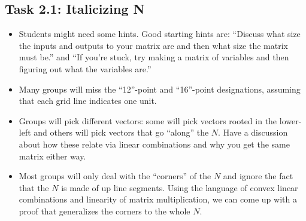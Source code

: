 \documentclass{problemset}
\begin{document}
\begin{iola}
\section*{Task 2.1: Italicizing N}

\hfill{}\hfill
{}\hfill


	\begin{annotation}
		\begin{notes}
			\begin{itemize}
				\item Students might need some hints. Good starting hints are: ``Discuss
					what size the inputs and outputs to your matrix are and then what size
					the matrix must be.'' and ``If you're stuck, try making a matrix of variables
					and then figuring out what the variables are.''
				\item Many groups will miss the ``12''-point and ``16''-point designations, assuming that each
					grid line indicates one unit.
				\item Groups will pick different vectors: some will pick
					vectors rooted in the lower-left and others will pick vectors
					that go ``along'' the $N$. Have a discussion about how
					these relate via linear combinations and why you get the
					same matrix either way.
				\item Most groups will only deal with the ``corners'' of the $N$ and ignore
					the fact that the $N$ is made of up line segments. Using the language
					of convex linear combinations and linearity of matrix multiplication,
					we can come up with a proof that generalizes the corners to the whole $N$.
			\end{itemize}
		\end{notes}
	\end{annotation}


\end{iola}
\end{document}
